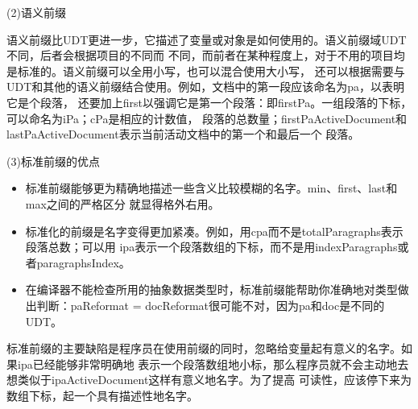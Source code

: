 \documentclass{article}
\begin{document}
\par
(2)语义前缀
\par
语义前缀比UDT更进一步，它描述了变量或对象是如何使用的。语义前缀域UDT不同，后者会根据项目的不同而
不同，而前者在某种程度上，对于不用的项目均是标准的。语义前缀可以全用小写，也可以混合使用大小写，
还可以根据需要与UDT和其他的语义前缀结合使用。例如，文档中的第一段应该命名为pa，以表明它是个段落，
还要加上first以强调它是第一个段落：即firstPa。一组段落的下标，可以命名为iPa；cPa是相应的计数值，
段落的总数量；firstPaActiveDocument和lastPaActiveDocument表示当前活动文档中的第一个和最后一个
段落。

\par
(3)标准前缀的优点
\par
\begin{itemize}
    \item 标准前缀能够更为精确地描述一些含义比较模糊的名字。min、first、last和max之间的严格区分
    就显得格外右用。
    \item 标准化的前缀是名字变得更加紧凑。例如，用cpa而不是totalParagraphs表示段落总数；可以用
    ipa表示一个段落数组的下标，而不是用indexParagraphs或者paragraphsIndex。
    \item 在编译器不能检查所用的抽象数据类型时，标准前缀能帮助你准确地对类型做出判断：paReformat
    = docReformat很可能不对，因为pa和doc是不同的UDT。
\end{itemize}
标准前缀的主要缺陷是程序员在使用前缀的同时，忽略给变量起有意义的名字。如果ipa已经能够非常明确地
表示一个段落数组地小标，那么程序员就不会主动地去想类似于ipaActiveDocument这样有意义地名字。为了提高
可读性，应该停下来为数组下标，起一个具有描述性地名字。
\end{document}
